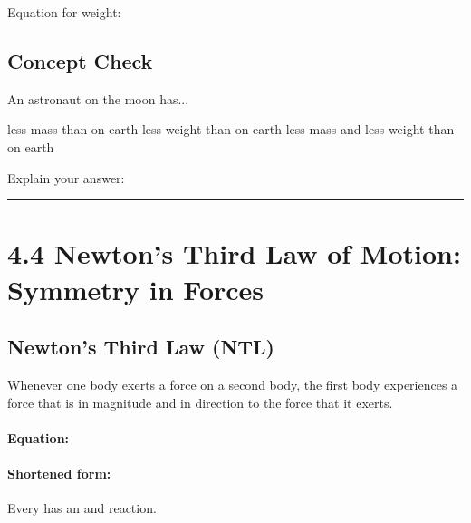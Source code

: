 \documentclass[10pt]{exam}
\begin{document}
\vspace{6em}

Equation for weight:

\vspace{2em}


\subsection*{Concept Check}

An astronaut on the moon has...

\begin{oneparcheckboxes}
  \choice less mass than on earth
  \correctchoice less weight than on earth
  \choice less mass and less weight than on earth
\end{oneparcheckboxes}

\hfill

Explain your answer:

\vspace{3em}

\vspace{1em}

\hrule

\pagebreak

\section*{4.4 Newton's Third Law of Motion: Symmetry in Forces}

\begin{Sbox}
  \begin{minipage}{6in}
    \subsection*{Newton's Third Law (NTL)}

    Whenever one body exerts a force on a second body, the first body experiences a force that is \fillin[equal][7em] in magnitude and \fillin[opposite][7em] in direction to the force that it exerts.

    \paragraph{Equation:}\hfill 

    \vspace{3em}

    \paragraph{Shortened form:} Every \fillin[action][7em] has an \fillin[equal][6em] and \fillin[opposite][6em] reaction.

  \end{minipage}
\end{Sbox}
\end{document}
